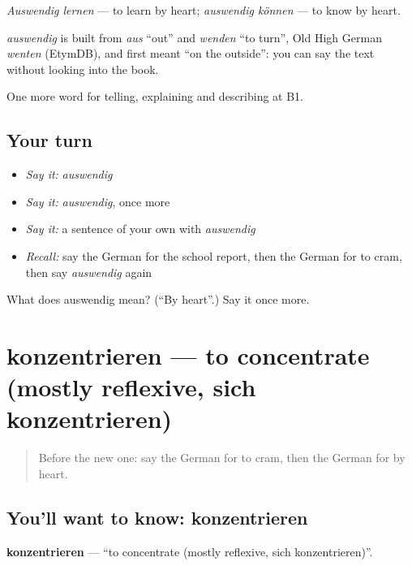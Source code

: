 \emph{Auswendig lernen} — to learn by heart; \emph{auswendig können} — to know by heart.

\begin{cousinweb}
\emph{auswendig} is built from \emph{aus} \textquotedblleft{}out\textquotedblright{} and \emph{wenden} \textquotedblleft{}to turn\textquotedblright{}, Old High German \emph{wenten} (EtymDB), and first meant \textquotedblleft{}on the outside\textquotedblright{}: you can say the text without looking into the book.
\end{cousinweb}

\begin{grammarlens}[title={What you've built}]
One more word for telling, explaining and describing at B1.
\end{grammarlens}

\subsection*{Your turn}
\begin{itemize}
\raggedright
  \item \emph{Say it:} \emph{auswendig}
  \item \emph{Say it:} \emph{auswendig}, once more
  \item \emph{Say it:} a sentence of your own with \emph{auswendig}
  \item \emph{Recall:} say the German for the school report, then the German for to cram, then say \emph{auswendig} again
\end{itemize}

\begin{tcolorbox}[breakable,colback=teal!4,colframe=teal!35!black,title={Before you move on}]
What does auswendig mean? (\textquotedblleft{}By heart\textquotedblright{}.) Say it once more.
\end{tcolorbox}
\section[konzentrieren]{konzentrieren — to concentrate (mostly reflexive, sich konzentrieren)}

\label{lesson:GE-C376-konzentrieren}



\begin{quote}
Before the new one: say the German for to cram, then the German for by heart.
\end{quote}

\subsection*{You'll want to know: konzentrieren}
\textbf{konzentrieren} — \textquotedblleft{}to concentrate (mostly reflexive, sich konzentrieren)\textquotedblright{}.

